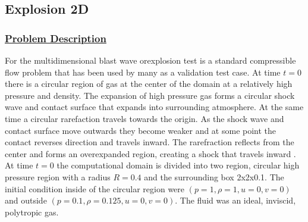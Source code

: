 \subsection*{\center Explosion 2D}
%
%
\subsubsection*{\underline{Problem Description}}
%
For the multidimensional blast wave orexplosion test is a standard compressible flow problem that has been used by many as a validation test case.  At time $t=0$ there is a circular region of gas at the center of the domain at a relatively high pressure and density.  The expansion of high pressure gas forms a circular shock wave and contact surface that expands into surrounding atmosphere.  At the same time a circular rarefaction travels towards the origin.  As the shock wave and contact surface move outwards they become weaker and at some point the contact reverses direction and travels inward. The rarefraction reflects from the center and forms an overexpanded region, creating a shock that travels inward \cite{ref:toro}.  At time $t=0$ the computational domain is divided into two region, circular high pressure region with a radius $R=0.4$ and the surrounding box 2x2x0.1.  The initial condition inside of the circular region were $(p=1, \rho=1, u=0, v=0)$  and outside $(p=0.1, \rho=0.125, u=0, v=0).$  The fluid was an ideal, inviscid, polytropic gas.
%
